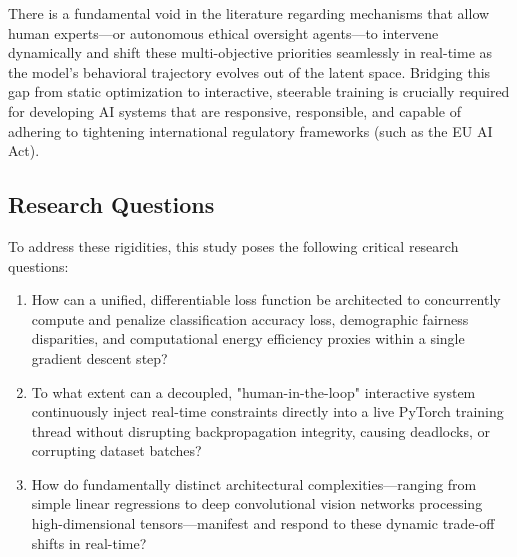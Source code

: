 \documentclass[12pt,a4paper]{article}
\begin{document}
There is a fundamental void in the literature regarding mechanisms that allow human experts—or autonomous ethical oversight agents—to intervene dynamically and shift these multi-objective priorities seamlessly in real-time as the model's behavioral trajectory evolves out of the latent space. Bridging this gap from static optimization to interactive, steerable training is crucially required for developing AI systems that are responsive, responsible, and capable of adhering to tightening international regulatory frameworks (such as the EU AI Act).

\subsection{Research Questions}
To address these rigidities, this study poses the following critical research questions:
\begin{enumerate}
    \item How can a unified, differentiable loss function be architected to concurrently compute and penalize classification accuracy loss, demographic fairness disparities, and computational energy efficiency proxies within a single gradient descent step?
    \item To what extent can a decoupled, "human-in-the-loop" interactive system continuously inject real-time constraints directly into a live PyTorch training thread without disrupting backpropagation integrity, causing deadlocks, or corrupting dataset batches?
    \item How do fundamentally distinct architectural complexities—ranging from simple linear regressions to deep convolutional vision networks processing high-dimensional tensors—manifest and respond to these dynamic trade-off shifts in real-time?
\end{enumerate}
\end{document}
